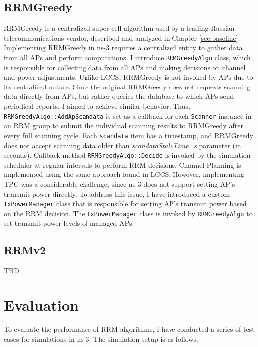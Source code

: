 \subsection{RRMGreedy}
\label{chap:impl:sec:implementation:rrmgreedy}
RRMGreedy is a centralized super-cell algorithm used by a leading Russian telecommunications vendor, described and analyzed in Chapter \ref{sec:baseline}.
Implementing RRMGreedy in ns-3 requires a centralized entity to gather data from all APs and perform computations. I introduce \texttt{RRMGreedyAlgo} class, which is responsible for collecting data from all APs and making decisions on channel and power adjustments.
Unlike LCCS, RRMGreedy is not invoked by APs due to its centralized nature. Since the original RRMGreedy does not requests scanning data directly from APs, but rather queries the database to which APs send periodical reports, I aimed to achieve similar behavior.
Thus, \texttt{RRMGreedyAlgo::AddApScandata} is set as a callback for each \texttt{Scanner} instance in an RRM group to submit the individual scanning results to RRMGreedy after every full scanning cycle. Each \texttt{scandata} item has a timestamp, and RRMGreedy does not accept scanning data older than \textit{scandataStaleTime\_s} parameter (in seconds). Callback method \texttt{RRMGreedyAlgo::Decide} is invoked by the simulation scheduler at regular intervals to perform RRM decisions.
Channel Planning is implemented using the same approach found in LCCS. However, implementing TPC was a considerable challenge, since ns-3 does not support setting AP's transmit power directly. To address this issue, I have introduced a custom \texttt{TxPowerManager} class that is responsible for setting AP's transmit power based on the RRM decision. The \texttt{TxPowerManager} class is invoked by \texttt{RRMGreedyAlgo} to set transmit power levels of managed APs.

\subsection{RRMv2}
\label{chap:impl:sec:implementation:rrmv2}
TBD

\section{Evaluation}
\label{chap:impl:sec:eval}
To evaluate the performance of RRM algorithms, I have conducted a series of test cases for simulations in ns-3.
The simulation setup is as follows.
